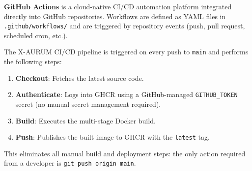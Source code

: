 \textbf{GitHub Actions} is a cloud-native CI/CD automation platform integrated directly into GitHub repositories. Workflows are defined as YAML files in \texttt{.github/workflows/} and are triggered by repository events (push, pull request, scheduled cron, etc.).

The X-AURUM CI/CD pipeline is triggered on every push to \texttt{main} and performs the following steps:
\begin{enumerate}
  \item \textbf{Checkout}: Fetches the latest source code.
  \item \textbf{Authenticate}: Logs into GHCR using a GitHub-managed \texttt{GITHUB\_TOKEN} secret (no manual secret management required).
  \item \textbf{Build}: Executes the multi-stage Docker build.
  \item \textbf{Push}: Publishes the built image to GHCR with the \texttt{latest} tag.
\end{enumerate}

This eliminates all manual build and deployment steps: the only action required from a developer is \texttt{git push origin main}.

\newpage
